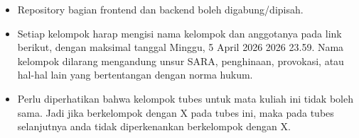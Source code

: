 \begin{itemize}
\begin{enumerate}
              \item Setelah melakukan penelusuran, aplikasi menyimpan sebuah traversal log yang memiliki informasi tahapan penelusuran yang dilakukan.
          \end{enumerate}
    \item Repository bagian frontend dan backend boleh digabung/dipisah.
    \item Setiap kelompok harap mengisi nama kelompok dan anggotanya pada link berikut, dengan maksimal tanggal Minggu, 5 April 2026 2026 23.59. Nama kelompok dilarang mengandung unsur SARA, penghinaan, provokasi, atau hal-hal lain yang bertentangan dengan norma hukum.
    \item Perlu diperhatikan bahwa kelompok tubes untuk mata kuliah ini tidak boleh sama. Jadi jika berkelompok dengan X pada tubes ini, maka pada tubes selanjutnya anda tidak diperkenankan berkelompok dengan X.
\end{itemize}

